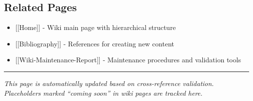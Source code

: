 \subsection{Related Pages}\label{related-pages}

\begin{itemize}
\tightlist
\item
  {[}{[}Home{]}{]} - Wiki main page with hierarchical structure
\item
  {[}{[}Bibliography{]}{]} - References for creating new content
\item
  {[}{[}Wiki-Maintenance-Report{]}{]} - Maintenance procedures and
  validation tools
\end{itemize}

\begin{center}\rule{0.5\linewidth}{0.5pt}\end{center}

\emph{This page is automatically updated based on cross-reference
validation. Placeholders marked ``coming soon'' in wiki pages are
tracked here.}
